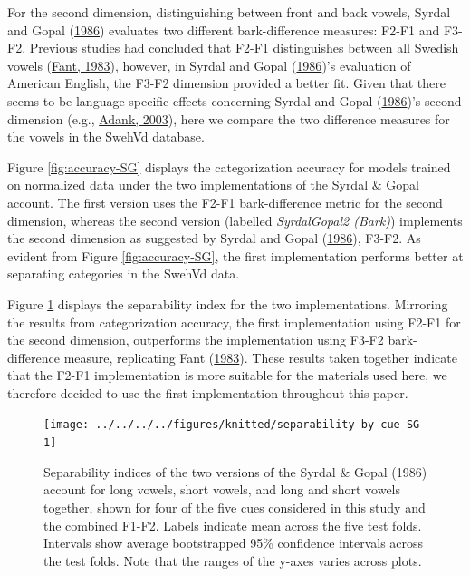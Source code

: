 \documentclass[utf8]{frontiers_suppmat} %
\begin{document}
For the second dimension, distinguishing between front and back vowels, Syrdal and Gopal (\protect\hyperlink{ref-Syrdal1986}{1986}) evaluates two different bark-difference measures: F2-F1 and F3-F2. Previous studies had concluded that F2-F1 distinguishes between all Swedish vowels (\protect\hyperlink{ref-fant1983}{Fant, 1983}), however, in Syrdal and Gopal (\protect\hyperlink{ref-Syrdal1986}{1986})'s evaluation of American English, the F3-F2 dimension provided a better fit. Given that there seems to be language specific effects concerning Syrdal and Gopal (\protect\hyperlink{ref-Syrdal1986}{1986})'s second dimension (e.g., \protect\hyperlink{ref-adank2003}{Adank, 2003}), here we compare the two difference measures for the vowels in the SwehVd database.

Figure \ref{fig:accuracy-SG} displays the categorization accuracy for models trained on normalized data under the two implementations of the Syrdal \& Gopal account. The first version uses the F2-F1 bark-difference metric for the second dimension, whereas the second version (labelled \emph{SyrdalGopal2 (Bark)}) implements the second dimension as suggested by Syrdal and Gopal (\protect\hyperlink{ref-Syrdal1986}{1986}), F3-F2. As evident from Figure \ref{fig:accuracy-SG}, the first implementation performs better at separating categories in the SwehVd data.

Figure \ref{fig:separability-by-cue-SG} displays the separability index for the two implementations.  Mirroring the results from categorization accuracy, the first implementation using F2-F1 for the second dimension, outperforms the implementation using F3-F2 bark-difference measure,  replicating Fant (\protect\hyperlink{ref-fant1983}{1983}). These results taken together indicate that the F2-F1 implementation is more suitable for the materials used here, we therefore decided to use the first implementation throughout this paper.


\begin{figure}[H]

{\centering \texttt{[image: ../../../../figures/knitted/separability-by-cue-SG-1]} 

}

\caption{Separability indices of the two versions of the Syrdal \& Gopal (1986) account for long vowels, short vowels, and long and short vowels together, shown for four of the five cues considered in this study and the combined F1-F2. Labels indicate mean across the five test folds. Intervals show average bootstrapped 95\% confidence intervals across the test folds. Note that the ranges of the y-axes varies across plots.}\label{fig:separability-by-cue-SG}
\end{figure}
\end{document}
